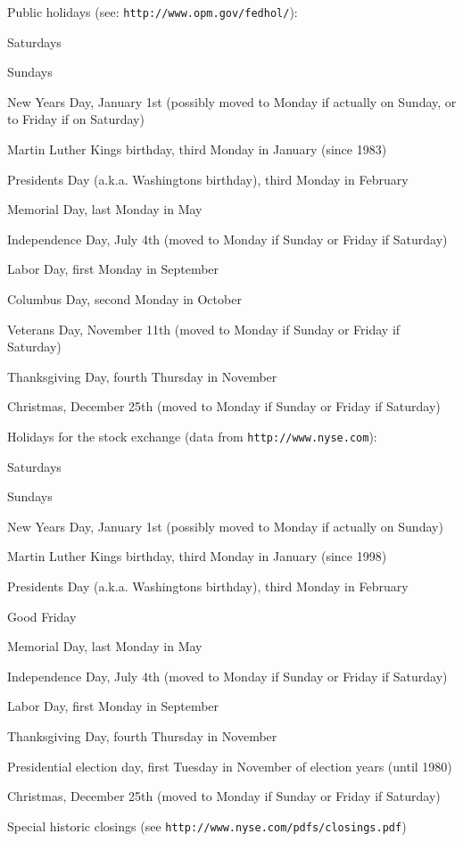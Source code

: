 Public holidays (see\+: {\tt http\+://www.\+opm.\+gov/fedhol/})\+: 
\begin{DoxyItemize}
\item Saturdays 
\item Sundays 
\item New Year\textquotesingle{}s Day, January 1st (possibly moved to Monday if actually on Sunday, or to Friday if on Saturday) 
\item Martin Luther King\textquotesingle{}s birthday, third Monday in January (since 1983) 
\item Presidents\textquotesingle{} Day (a.\+k.\+a. Washington\textquotesingle{}s birthday), third Monday in February 
\item Memorial Day, last Monday in May 
\item Independence Day, July 4th (moved to Monday if Sunday or Friday if Saturday) 
\item Labor Day, first Monday in September 
\item Columbus Day, second Monday in October 
\item Veterans\textquotesingle{} Day, November 11th (moved to Monday if Sunday or Friday if Saturday) 
\item Thanksgiving Day, fourth Thursday in November 
\item Christmas, December 25th (moved to Monday if Sunday or Friday if Saturday) 
\end{DoxyItemize}

Holidays for the stock exchange (data from {\tt http\+://www.\+nyse.\+com})\+: 
\begin{DoxyItemize}
\item Saturdays 
\item Sundays 
\item New Year\textquotesingle{}s Day, January 1st (possibly moved to Monday if actually on Sunday) 
\item Martin Luther King\textquotesingle{}s birthday, third Monday in January (since 1998) 
\item Presidents\textquotesingle{} Day (a.\+k.\+a. Washington\textquotesingle{}s birthday), third Monday in February 
\item Good Friday 
\item Memorial Day, last Monday in May 
\item Independence Day, July 4th (moved to Monday if Sunday or Friday if Saturday) 
\item Labor Day, first Monday in September 
\item Thanksgiving Day, fourth Thursday in November 
\item Presidential election day, first Tuesday in November of election years (until 1980) 
\item Christmas, December 25th (moved to Monday if Sunday or Friday if Saturday) 
\item Special historic closings (see {\tt http\+://www.\+nyse.\+com/pdfs/closings.\+pdf}) 
\end{DoxyItemize}

